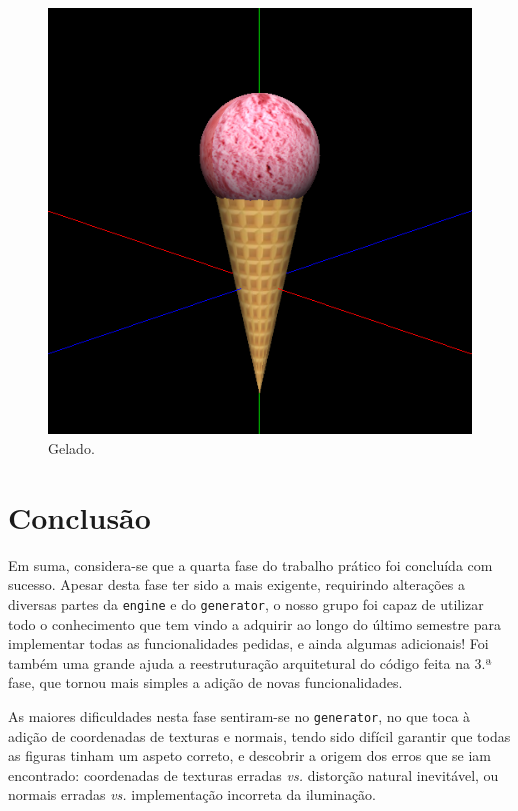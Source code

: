 \documentclass[12pt, a4paper]{article}
\begin{document}
\begin{figure}[H]
    \centering
    \includegraphics[width=\textwidth]{res/phase4/IceCreamXYZ.png}
    \caption{Gelado.}
\end{figure}

\section{Conclusão}

Em suma, considera-se que a quarta fase do trabalho prático foi concluída com sucesso. Apesar desta
fase ter sido a mais exigente, requirindo alterações a diversas partes da \texttt{engine} e do
\texttt{generator}, o nosso grupo foi capaz de utilizar todo o conhecimento que tem vindo a adquirir
ao longo do último semestre para implementar todas as funcionalidades pedidas, e ainda algumas
adicionais! Foi também uma grande ajuda a reestruturação arquitetural do código feita na 3.ª fase,
que tornou mais simples a adição de novas funcionalidades.

As maiores dificuldades nesta fase sentiram-se no \texttt{generator}, no que toca à adição de
coordenadas de texturas e normais, tendo sido difícil garantir que todas as figuras tinham um aspeto
correto, e descobrir a origem dos erros que se iam encontrado: coordenadas de texturas erradas
\emph{vs.} distorção natural inevitável, ou normais erradas \emph{vs.} implementação incorreta da
iluminação.
\end{document}
